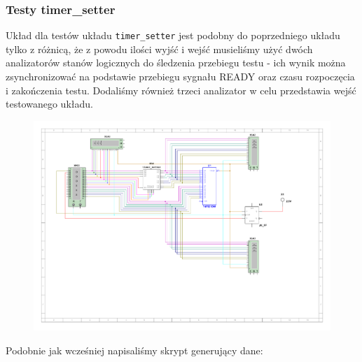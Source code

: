 \documentclass[a4paper]{article}
\begin{document}
\subsubsection{Testy timer\_setter}
Układ dla testów układu \verb|timer_setter| jest podobny do poprzedniego układu tylko z różnicą, że
z powodu ilości wyjść i wejść musieliśmy użyć dwóch analizatorów stanów logicznych do śledzenia przebiegu testu - ich wynik 
można zsynchronizować na podstawie przebiegu sygnału READY oraz czasu rozpoczęcia i zakończenia testu.
Dodaliśmy również trzeci analizator w celu przedstawia wejść testowanego układu.

\begin{figure}[H]
    \centering
    \includegraphics[width=\textwidth]{component_tests_setter.pdf}
\end{figure}
\pagebreak
Podobnie jak wcześniej napisaliśmy skrypt generujący dane:
\small
\end{document}
